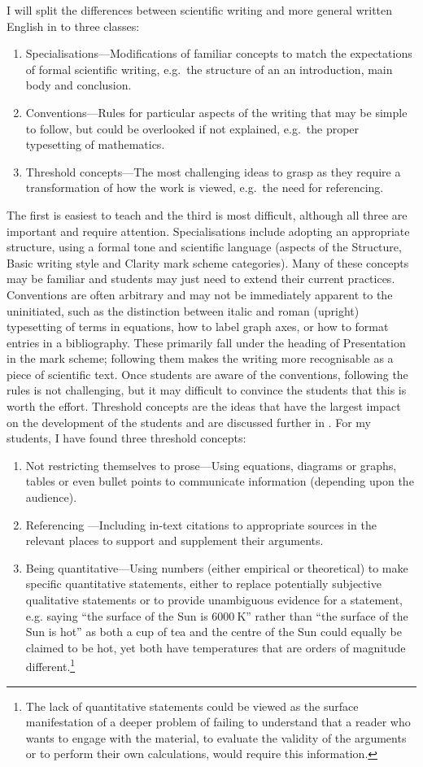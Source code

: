 I will split the differences between scientific writing and more general written English in to three classes:
\begin{enumerate}
\item Specialisations---Modifications of familiar concepts to match the expectations of formal scientific writing, e.g.\ the structure of an an introduction, main body and conclusion.
\item Conventions---Rules for particular aspects of the writing that may be simple to follow, but could be overlooked if not explained, e.g.\ the proper typesetting of mathematics.
\item Threshold concepts---The most challenging ideas to grasp as they require a transformation of how the work is viewed, e.g.\ the need for referencing.
\end{enumerate}
The first is easiest to teach and the third is most difficult, although all three are important and require attention. Specialisations include adopting an appropriate structure, using a formal tone and scientific language (aspects of the Structure, Basic writing style and Clarity mark scheme categories). Many of these concepts may be familiar and students may just need to extend their current practices. Conventions are often arbitrary and may not be immediately apparent to the uninitiated, such as the distinction between italic and roman (upright) typesetting of terms in equations, how to label graph axes, or how to format entries in a bibliography. These primarily fall under the heading of Presentation in the mark scheme; following them makes the writing more recognisable as a piece of scientific text. Once students are aware of the conventions, following the rules is not challenging, but it may difficult to convince the students that this is worth the effort. Threshold concepts are the ideas that have the largest impact on the development of the students and are discussed further in . For my students, I have found three threshold concepts:
\begin{enumerate}
\item Not restricting themselves to prose---Using equations, diagrams or graphs, tables or even bullet points to communicate information (depending upon the audience).
\item Referencing \citep{Warner2011}---Including in-text citations to appropriate sources in the relevant places to support and supplement their arguments.
\item Being quantitative---Using numbers (either empirical or theoretical) to make specific quantitative statements, either to replace potentially subjective qualitative statements or to provide unambiguous evidence for a statement, e.g. saying ``the surface of the Sun is $6000~\mathrm{K}$'' rather than ``the surface of the Sun is hot'' as both a cup of tea and the centre of the Sun could equally be claimed to be hot, yet both have temperatures that are orders of magnitude different.\footnote{The lack of quantitative statements could be viewed as the surface manifestation of a deeper problem of failing to understand that a reader who wants to engage with the material, to evaluate the validity of the arguments or to perform their own calculations, would require this information.}
\end{enumerate}
